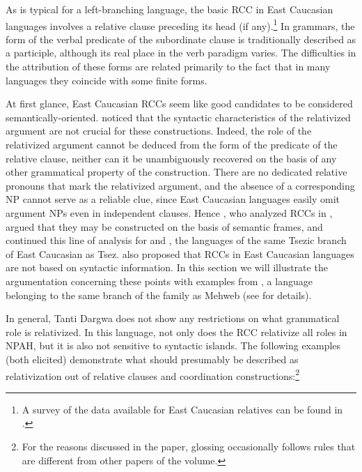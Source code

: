 ﻿\documentclass[output=paper]{langsci/langscibook}
\begin{document}
As is typical for a left-branching language, the basic RCC in East
Caucasian languages involves a relative clause preceding its head (if
any).\footnote{A survey of the data available for East Caucasian
  relatives can be found in \citet{barylnikova2015}.} In grammars, the form of
the verbal predicate of the subordinate clause is traditionally
described as a participle, although its real place in the verb paradigm
varies. The difficulties in the attribution of these forms are related
primarily to the fact that in many languages they coincide with some
finite forms.

At first glance, East Caucasian RCCs seem like good candidates to be
considered semantically-oriented. \citet[33]{kibrik1980} noticed that the
syntactic characteristics of the relativized argument are not crucial
for these constructions. Indeed, the role of the relativized argument
cannot be deduced from the form of the predicate of the relative clause,
neither can it be unambiguously recovered on the basis of any other
grammatical property of the construction. There are no dedicated
relative pronouns that mark the relativized argument, and the absence of
a corresponding NP cannot serve as a reliable clue, since East Caucasian
languages easily omit argument NPs even in independent clauses. Hence
\citet{comrie-polinsky1999}, who analyzed RCCs in , argued that they
may be constructed on the basis of semantic frames, and \citet{comrie-etal2017}
continued this line of analysis for  and , the
languages of the same Tsezic branch of East Caucasian as Tsez.
\citet{daniel-lander2008, daniel-lander2010}
  also proposed that RCCs in East Caucasian languages
are not based on syntactic information. In this section we will
illustrate the argumentation concerning these points with examples from
, a language belonging to the same branch of the family as
Mehweb (see \citealt{sumbatova-lander2014} for details).

In general, Tanti Dargwa does not show any restrictions on what
grammatical role is relativized. In this language, not only does the RCC
relativize all roles in NPAH, but it is also not sensitive to syntactic
islands. The following examples (both elicited) demonstrate what should
presumably be described as relativization out of relative clauses and
coordination constructions:\footnote{For the reasons discussed in the
  paper, glossing occasionally follows rules that are different
  from other papers of the volume.}
\end{document}
